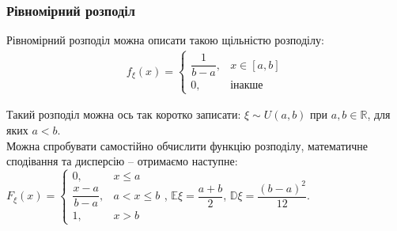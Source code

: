 \documentclass[a4paper, 10pt]{article}
\theoremstyle{theoremdd}
\newtheorem{example}[theorem]{Example}
\begin{document}
\subsubsection{Рівномірний розподіл}
Рівномірний розподіл можна описати такою щільністю розподілу:
\begin{align*}
f_\xi(x) = \begin{cases} \dfrac{1}{b-a},& x \in [a,b] \\ 0, & \text{інакше} \end{cases}
\end{align*}
\begin{figure}[H]
\centering
{}
\end{figure}
\noindent
Такий розподіл можна ось так коротко записати: $\xi \sim U(a,b)$ при $a,b \in \mathbb{R}$, для яких $a < b$.\\
Можна спробувати самостійно обчислити функцію розподілу, математичне сподівання та дисперсію -- отримаємо наступне:\\
$F_\xi(x) = \begin{cases} 0, & x \leq a \\ \dfrac{x-a}{b-a}, & a < x \leq b \\ 1, & x > b \end{cases}$, \qquad $\mathbb{E}\xi = \dfrac{a+b}{2}$, \qquad $\mathbb{D}\xi = \dfrac{(b-a)^2}{12}$.
\begin{figure}[H]
\centering
{}
\end{figure}

\iffalse
\begin{example}
Маємо секундомір, ціна поділки якого $0.2$ секунди. Знайти ймовірність того, що помилка вимірювання буде більшою за $0.05$ секунд.\\
Позначимо $\xi$ -- випадкова величина, яка задає похибку. Зауважимо, що $\xi \sim U\left( -0.1,0.1 \right)$. Тоді звідси $\mathbb{P}\{ |\xi| > 0.05 \} = 2 \mathbb{P} \{\xi > 0.05\} = 2 \cdot 5 \cdot 0.05 = 0.5$.
\end{example}
\fi
\end{document}
